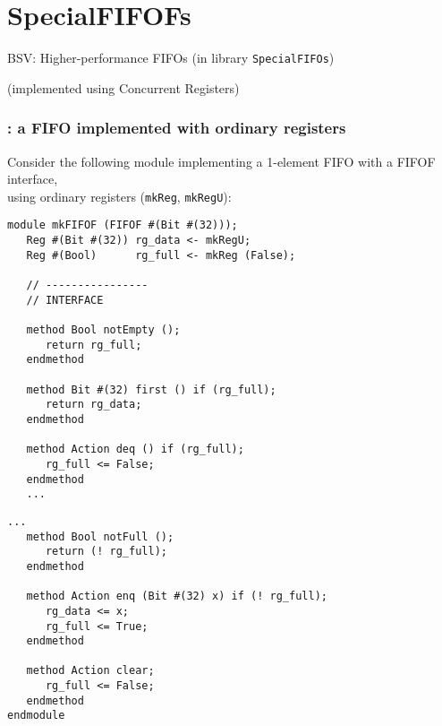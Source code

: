 
\section{SpecialFIFOFs}

\begin{frame}

\begin{center}
  {\LARGE BSV: Higher-performance FIFOs (in library {\tt SpecialFIFOs})}

  \vspace{5ex}

  (implemented using Concurrent Registers)
\end{center}

\end{frame}


\begin{frame}[fragile]
\frametitle{{\BSV}: a FIFO implemented with ordinary registers}

\footnotesize

Consider the following module implementing a 1-element FIFO with a
FIFOF interface, \\
using ordinary registers ({\tt mkReg}, {\tt mkRegU}):

\vspace{2ex}

\begin{center}
\begin{minipage}[t]{0.45\textwidth}\scriptsize
\begin{Verbatim}[frame=single]
module mkFIFOF (FIFOF #(Bit #(32)));
   Reg #(Bit #(32)) rg_data <- mkRegU;
   Reg #(Bool)      rg_full <- mkReg (False);

   // ----------------
   // INTERFACE

   method Bool notEmpty ();
      return rg_full;
   endmethod

   method Bit #(32) first () if (rg_full);
      return rg_data;
   endmethod

   method Action deq () if (rg_full);
      rg_full <= False;
   endmethod
   ...
\end{Verbatim}
\end{minipage}
\begin{minipage}[t]{0.45\textwidth}\scriptsize
\begin{Verbatim}[frame=single]
   ...
   method Bool notFull ();
      return (! rg_full);
   endmethod

   method Action enq (Bit #(32) x) if (! rg_full);
      rg_data <= x;
      rg_full <= True;
   endmethod

   method Action clear;
      rg_full <= False;
   endmethod
endmodule
\end{Verbatim}
\end{minipage}
\end{center}

\end{frame}

